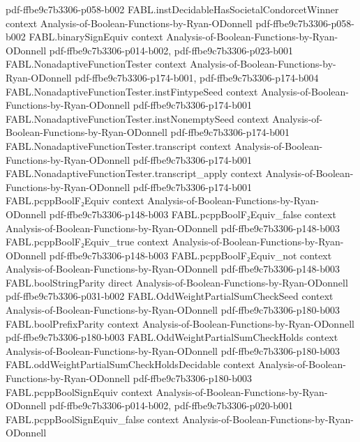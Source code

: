 \begin{theorem}
  {pdf-ffbe9c7b3306-p058-b002}
\proofstep
  {FABL.instDecidableHasSocietalCondorcetWinner}
  {context}
  {Analysis-of-Boolean-Functions-by-Ryan-ODonnell}
  {pdf-ffbe9c7b3306-p058-b002}
\proofstep
  {FABL.binarySignEquiv}
  {context}
  {Analysis-of-Boolean-Functions-by-Ryan-ODonnell}
  {pdf-ffbe9c7b3306-p014-b002,
    pdf-ffbe9c7b3306-p023-b001}
\proofstep
  {FABL.NonadaptiveFunctionTester}
  {context}
  {Analysis-of-Boolean-Functions-by-Ryan-ODonnell}
  {pdf-ffbe9c7b3306-p174-b001,
    pdf-ffbe9c7b3306-p174-b004}
\proofstep
  {FABL.NonadaptiveFunctionTester.instFintypeSeed}
  {context}
  {Analysis-of-Boolean-Functions-by-Ryan-ODonnell}
  {pdf-ffbe9c7b3306-p174-b001}
\proofstep
  {FABL.NonadaptiveFunctionTester.instNonemptySeed}
  {context}
  {Analysis-of-Boolean-Functions-by-Ryan-ODonnell}
  {pdf-ffbe9c7b3306-p174-b001}
\proofstep
  {FABL.NonadaptiveFunctionTester.transcript}
  {context}
  {Analysis-of-Boolean-Functions-by-Ryan-ODonnell}
  {pdf-ffbe9c7b3306-p174-b001}
\proofstep
  {FABL.NonadaptiveFunctionTester.transcript_apply}
  {context}
  {Analysis-of-Boolean-Functions-by-Ryan-ODonnell}
  {pdf-ffbe9c7b3306-p174-b001}
\proofstep
  {FABL.pcppBoolF₂Equiv}
  {context}
  {Analysis-of-Boolean-Functions-by-Ryan-ODonnell}
  {pdf-ffbe9c7b3306-p148-b003}
\proofstep
  {FABL.pcppBoolF₂Equiv_false}
  {context}
  {Analysis-of-Boolean-Functions-by-Ryan-ODonnell}
  {pdf-ffbe9c7b3306-p148-b003}
\proofstep
  {FABL.pcppBoolF₂Equiv_true}
  {context}
  {Analysis-of-Boolean-Functions-by-Ryan-ODonnell}
  {pdf-ffbe9c7b3306-p148-b003}
\proofstep
  {FABL.pcppBoolF₂Equiv_not}
  {context}
  {Analysis-of-Boolean-Functions-by-Ryan-ODonnell}
  {pdf-ffbe9c7b3306-p148-b003}
\proofstep
  {FABL.boolStringParity}
  {direct}
  {Analysis-of-Boolean-Functions-by-Ryan-ODonnell}
  {pdf-ffbe9c7b3306-p031-b002}
\proofstep
  {FABL.OddWeightPartialSumCheckSeed}
  {context}
  {Analysis-of-Boolean-Functions-by-Ryan-ODonnell}
  {pdf-ffbe9c7b3306-p180-b003}
\proofstep
  {FABL.boolPrefixParity}
  {context}
  {Analysis-of-Boolean-Functions-by-Ryan-ODonnell}
  {pdf-ffbe9c7b3306-p180-b003}
\proofstep
  {FABL.OddWeightPartialSumCheckHolds}
  {context}
  {Analysis-of-Boolean-Functions-by-Ryan-ODonnell}
  {pdf-ffbe9c7b3306-p180-b003}
\proofstep
  {FABL.oddWeightPartialSumCheckHoldsDecidable}
  {context}
  {Analysis-of-Boolean-Functions-by-Ryan-ODonnell}
  {pdf-ffbe9c7b3306-p180-b003}
\proofstep
  {FABL.pcppBoolSignEquiv}
  {context}
  {Analysis-of-Boolean-Functions-by-Ryan-ODonnell}
  {pdf-ffbe9c7b3306-p014-b002,
    pdf-ffbe9c7b3306-p020-b001}
\proofstep
  {FABL.pcppBoolSignEquiv_false}
  {context}
  {Analysis-of-Boolean-Functions-by-Ryan-ODonnell}

\end{theorem}

